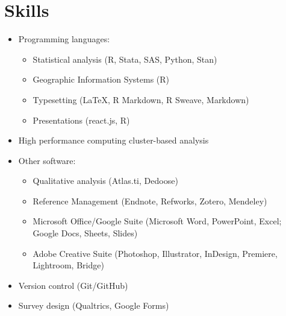 \documentclass{cv_style}
\begin{document}
\section{Skills}
\begin{itemize}
    \item Programming languages: 
    \begin{itemize}
        \item Statistical analysis (R, Stata, SAS, Python, Stan)
        \item \parskip 1pt Geographic Information Systems (R)
        \item \parskip 1pt Typesetting (\LaTeX, R Markdown, R Sweave, Markdown) 
        \item \parskip 1pt Presentations (react.js, R) 
    \end{itemize}
    \item \parskip 1pt High performance computing cluster-based analysis
    \item \parskip 1pt Other software: 
    \begin{itemize}
        \item \parskip 1pt Qualitative analysis (Atlas.ti, Dedoose)
        \item \parskip 1pt Reference Management (Endnote, Refworks, Zotero, Mendeley)
        \item \parskip 1pt Microsoft Office/Google Suite (Microsoft Word, PowerPoint, Excel; Google Docs, Sheets, Slides)
        \item \parskip 1pt Adobe Creative Suite (Photoshop, Illustrator, InDesign, Premiere, Lightroom, Bridge)
    \end{itemize}
    \item \parskip 1pt Version control (Git/GitHub)
    \item \parskip 1pt Survey design (Qualtrics, Google Forms)
\end{itemize}
\end{document}
